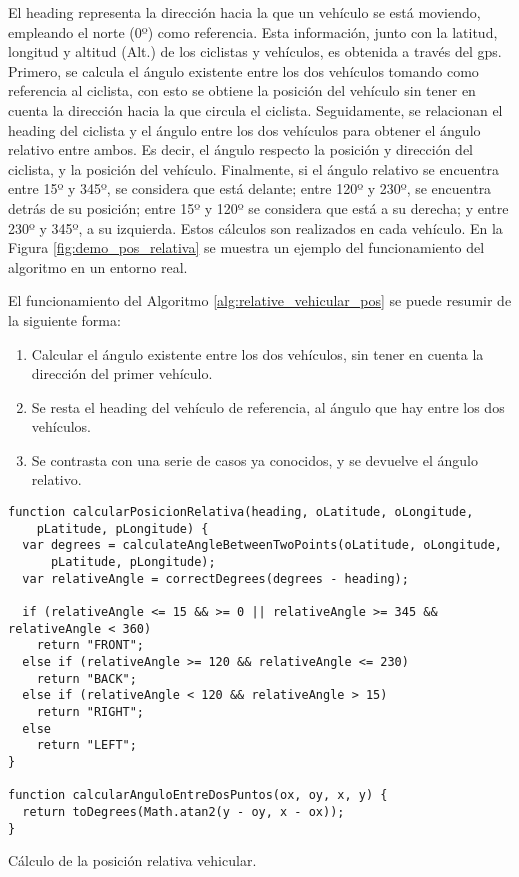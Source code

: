 El heading representa la dirección hacia la que un vehículo se está moviendo,
empleando el norte (0º) como referencia. Esta información, junto con la
latitud, longitud y altitud (Alt.) de los ciclistas y vehículos, es obtenida a
través del \gls{gps}. Primero, se calcula el ángulo existente entre los dos
vehículos tomando como referencia al ciclista, con esto se obtiene la posición
del vehículo sin tener en cuenta la dirección hacia la que circula el ciclista.
Seguidamente, se relacionan el heading del ciclista y el ángulo entre los dos
vehículos para obtener el ángulo relativo entre ambos. Es decir, el ángulo
respecto la posición y dirección del ciclista, y la posición del vehículo.
Finalmente, si el ángulo relativo se encuentra entre 15º y 345º, se considera
que está delante; entre 120º y 230º, se encuentra detrás de su posición; entre
15º y 120º se considera que está a su derecha; y entre 230º y 345º, a su
izquierda. Estos cálculos son realizados en cada vehículo. En la Figura
\ref{fig:demo_pos_relativa} se muestra un ejemplo del funcionamiento del
algoritmo en un entorno real.

El funcionamiento del Algoritmo \ref{alg:relative_vehicular_pos} se puede
resumir de la siguiente forma:
\begin{enumerate}
	\item Calcular el ángulo existente entre los dos vehículos, sin tener en
	cuenta la dirección del primer vehículo.

	\item Se resta el heading del vehículo de referencia, al ángulo que hay entre
	los dos vehículos.

	\item Se contrasta con una serie de casos ya conocidos, y se devuelve el
	ángulo relativo.
\end{enumerate}

\begin{listing}
	\begin{minipage}{.4\textwidth}
		\begin{verbatim}
function calcularPosicionRelativa(heading, oLatitude, oLongitude,
    pLatitude, pLongitude) {
  var degrees = calculateAngleBetweenTwoPoints(oLatitude, oLongitude,
      pLatitude, pLongitude);
  var relativeAngle = correctDegrees(degrees - heading);

  if (relativeAngle <= 15 && >= 0 || relativeAngle >= 345 && relativeAngle < 360)
    return "FRONT";
  else if (relativeAngle >= 120 && relativeAngle <= 230)
    return "BACK";
  else if (relativeAngle < 120 && relativeAngle > 15)
    return "RIGHT";
  else
    return "LEFT";
}

function calcularAnguloEntreDosPuntos(ox, oy, x, y) {
  return toDegrees(Math.atan2(y - oy, x - ox));
}
\end{verbatim}
\end{minipage}
\caption{Cálculo de la posición relativa vehicular.}
\label{alg:relative_vehicular_pos}
\end{listing}

